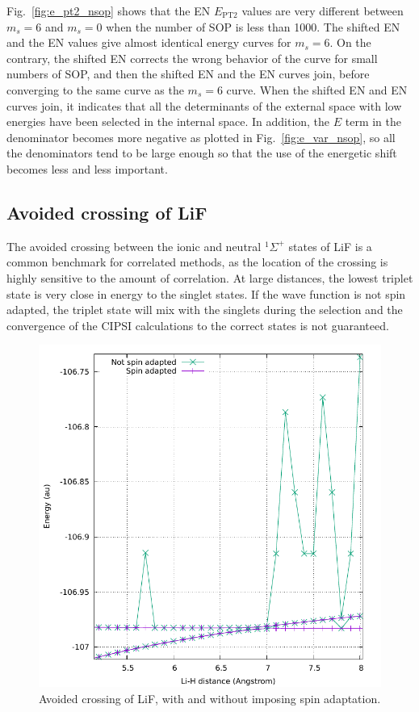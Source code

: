 \documentclass[aip,jcp,reprint,showkeys]{revtex4-1}
\newcommand{\sop}{SOP}
\newcommand{\cipsi}{CIPSI}
\newcommand{\ept}{E_\text{PT2}}
\begin{document}
Fig.~\ref{fig:e_pt2_nsop} shows that the EN $\ept$ values are very different
between $m_s=6$ and $m_s=0$ when the number of {\sop} is less than 1000. The
shifted EN and the EN values give almost identical energy curves for $m_s=6$.
On the contrary, the shifted EN
corrects the wrong behavior of the curve for small numbers of {\sop}, and then
the shifted EN and the EN curves join, before converging to the same curve as
the $m_s=6$ curve. When the shifted EN and EN curves join, it indicates
that all the determinants of the external space with low energies have been selected 
in the internal space. In addition, the $E$ term in the denominator becomes more
negative as plotted in Fig.~\ref{fig:e_var_nsop}, so all the denominators tend to be large enough so that the use of the energetic shift becomes less and
less important.


\subsection{Avoided crossing of LiF}

The avoided crossing between the ionic and neutral $^1\Sigma^+$ states of LiF is a 
common benchmark for correlated methods, as the location of the crossing is highly
sensitive to the amount of correlation. At large distances, the lowest triplet state
is very close in energy to the singlet states. If the wave function is not
spin adapted, the triplet state will mix with the singlets during the selection
and the convergence of the {\cipsi} calculations to the correct states is not guaranteed.

\begin{figure}
\includegraphics[width=0.9\columnwidth]{lif}
\caption{Avoided crossing of LiF, with and without imposing spin adaptation.}
\label{fig:lif}
\end{figure}
\end{document}
